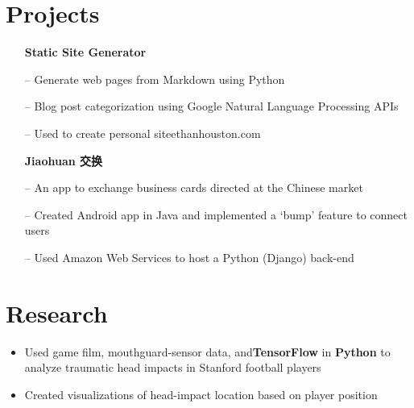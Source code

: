 \documentclass[]{houston-ethan-resume}
\begin{document}
\begin{minipage}[t]{0.66\textwidth}
\section{Projects}
\begin{multicols}{2}
\begin{itemize}
\item[] \textbf{Static Site Generator}
\item[--] Generate web pages from Markdown using Python
\item[--] Blog post categorization using Google ​Natural Language Processing​ APIs
\item[--] Used to create personal site ​ethanhouston.com​
\end{itemize}
\columnbreak
\begin{itemize}
\item[] \textbf{Jiaohuan 交换}
\item[--] An app to exchange business cards directed at
the Chinese market
\item[--] Created​ Android ​app in ​Java​ and implemented a
‘bump’ feature to connect users
\item[--] Used ​Amazon Web Services​ to host a ​Python
(Django) ​back-end
\end{itemize}
\end{multicols}


\section{Research}
\begin{itemize}
\item Used game film, mouthguard-sensor data, and ​\textbf{TensorFlow}​ in ​​\textbf{Python} ​to analyze traumatic head impacts in Stanford football players
\item Created visualizations of head-impact location based on player position
\end{itemize}
\sectionsep

\end{minipage}
\end{document}
